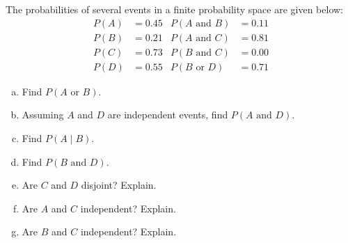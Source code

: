 \documentclass[11pt,letterpaper]{article}
\begin{document}

 The probabilities of several events in a finite probability space are given below:
	\[
	\begin{aligned}
	P(A)&= 0.45 & P(A \text{ and } B)&= 0.11 \\
	P(B)&= 0.21 & P(A \text{ and } C)&= 0.81 \\
	P(C)&= 0.73 & P(B \text{ and } C)&= 0.00 \\
	P(D)&= 0.55 & P(B \text{ or } D)&= 0.71
	\end{aligned}
	\] 
\begin{enumerate}[(a)]
\item Find $P(A \text{ or } B)$. 
\item Assuming $A$ and $D$ are independent events, find $P(A \text{ and } D)$.
\item Find $P(A \;|\; B)$.
\item Find $P(B \text{ and } D)$. 
\item Are $C$ and $D$ disjoint? Explain.
\item Are $A$ and $C$ independent? Explain.
\item Are $B$ and $C$ independent? Explain.
\end{enumerate} \pspace
\end{document}
